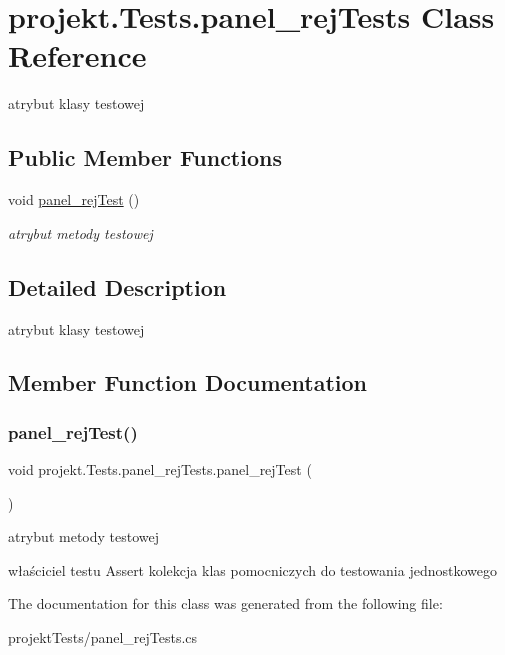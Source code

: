 \hypertarget{classprojekt_1_1_tests_1_1panel__rej_tests}{}\section{projekt.\+Tests.\+panel\+\_\+rej\+Tests Class Reference}
\label{classprojekt_1_1_tests_1_1panel__rej_tests}


atrybut klasy testowej  


\subsection*{Public Member Functions}
\begin{DoxyCompactItemize}
\item 
void \mbox{\hyperlink{classprojekt_1_1_tests_1_1panel__rej_tests_a95609fea527ffdbe58e63472bea8e84c}{panel\+\_\+rej\+Test}} ()
\begin{DoxyCompactList}\small\item\em atrybut metody testowej \end{DoxyCompactList}\end{DoxyCompactItemize}


\subsection{Detailed Description}
atrybut klasy testowej 

\subsection{Member Function Documentation}
\mbox{\label{classprojekt_1_1_tests_1_1panel__rej_tests_a95609fea527ffdbe58e63472bea8e84c}} 
\subsubsection{\texorpdfstring{panel\+\_\+rej\+Test()}{panel\_rejTest()}}
{\footnotesize\ttfamily void projekt.\+Tests.\+panel\+\_\+rej\+Tests.\+panel\+\_\+rej\+Test (\begin{DoxyParamCaption}{ }\end{DoxyParamCaption})\hspace{0.3cm}{\ttfamily [inline]}}



atrybut metody testowej 

właściciel testu Assert kolekcja klas pomocniczych do testowania jednostkowego 

The documentation for this class was generated from the following file\+:\begin{DoxyCompactItemize}
\item 
projekt\+Tests/panel\+\_\+rej\+Tests.\+cs\end{DoxyCompactItemize}
